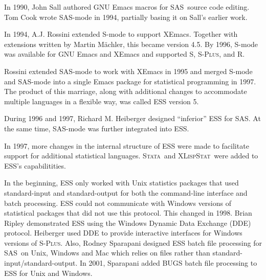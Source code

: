 \documentclass{article}
\newcommand*{\SAS}{\textsc{SAS}}
\newcommand*{\Splus}{\textsc{S-Plus}}
\newcommand*{\XLispStat}{\textsc{XLispStat}}
\newcommand*{\Stata}{\textsc{Stata}}
\newcommand{\stexttt}[1]{{\small\texttt{#1}}}
\begin{document}
In 1990, John Sall authored GNU Emacs macros for \SAS\ source code 
editing.  Tom Cook wrote SAS-mode in 1994, partially basing it on 
Sall's earlier work.  

In 1994, A.J. Rossini extended S-mode to support XEmacs.  
Together with extensions written by Martin M{\"a}chler, this
became version 4.5.  By 1996, S-mode was available for GNU Emacs and
XEmacs and supported S, \Splus, and R.


Rossini extended SAS-mode to work with XEmacs in 1995 and merged S-mode 
and SAS-mode into a single Emacs package for statistical programming in 1997.  
The product of this marriage, along with additional changes to accommodate 
multiple languages in a flexible way, was called ESS version 5.

During 1996 and 1997, Richard M. Heiberger designed ``inferior'' ESS for \SAS.
At the same time, SAS-mode was further integrated into ESS.

In 1997, more changes in the internal structure of ESS were made to
facilitate support for additional statistical languages.  \Stata\
and \XLispStat\ were added to ESS's capabilitities.

In the beginning, ESS only worked with Unix statistics packages that
used standard-input and standard-output for both the command-line 
interface and batch processing.  ESS could not communicate with Windows 
versions of statistical packages that did not use this protocol.  This 
changed in 1998.  Brian Ripley demonstrated ESS using the Windows Dynamic 
Data Exchange (DDE) protocol.  Heiberger used DDE to provide interactive 
interfaces for Windows versions of \Splus.  Also, Rodney Sparapani 
designed ESS batch file processing for \SAS\ on Unix, Windows and Mac 
which relies on files rather than standard-input/standard-output.  In 
2001, Sparapani added BUGS batch file processing to ESS for Unix and 
Windows.
\end{document}
